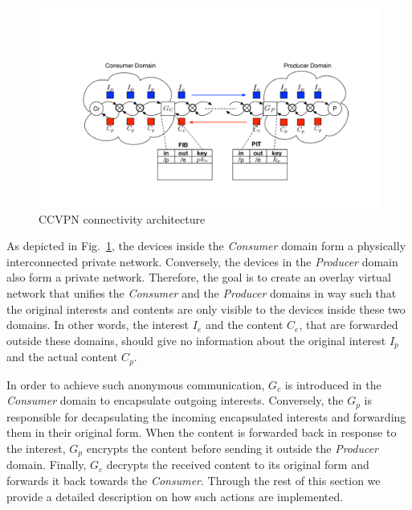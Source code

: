 \documentclass[conference,letterpaper,10pt]{IEEEtran}
\begin{document}
\begin{figure}[!ht]
\centering
\includegraphics[width=2\columnwidth]{ccvpn.pdf}
\caption{CCVPN connectivity architecture}
\label{fig:ccvpn}
\end{figure}

As depicted in Fig.~\ref{fig:ccvpn}, the devices inside the \textit{Consumer} domain form a physically interconnected private network. Conversely, the devices in the \textit{Producer} domain also form a private network. Therefore, the goal is to create an overlay virtual network that unifies the \textit{Consumer} and the \textit{Producer} domains in way such that the original interests and contents are only visible to the devices inside these two domains. In other words, the interest $I_e$ and the content $C_e$, that are forwarded outside these domains, should give no information about the original interest $I_p$ and the actual content $C_p$.


In order to achieve such anonymous communication, $G_c$ is introduced in the \textit{Consumer} domain to encapsulate outgoing interests. Conversely, the $G_p$ is responsible for decapsulating the incoming encapsulated interests and forwarding them in their original form. When the content is forwarded back in response to the interest, $G_p$ encrypts the content before sending it outside the \textit{Producer} domain. Finally, $G_c$ decrypts the received content to its original form and forwards it back towards the \textit{Consumer}. Through the rest of this section we provide a detailed description on how such actions are implemented.
\end{document}
